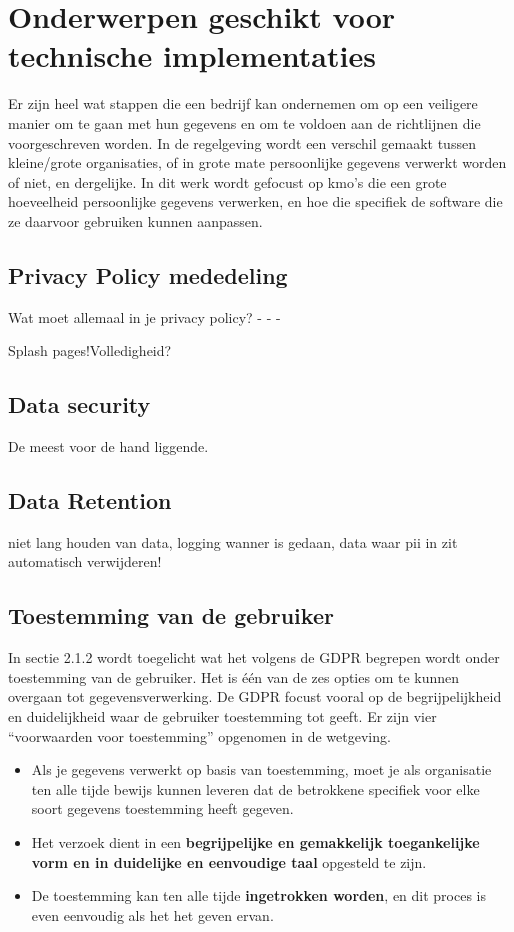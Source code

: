 \section{{Onderwerpen geschikt voor technische implementaties}}

Er zijn heel wat stappen die een bedrijf kan ondernemen om op een veiligere manier om te gaan met hun gegevens en om te voldoen aan de richtlijnen die voorgeschreven worden. 
In de regelgeving wordt een verschil gemaakt tussen kleine/grote organisaties, of in grote mate persoonlijke gegevens verwerkt worden of niet, en dergelijke. In dit werk wordt gefocust op kmo's die een grote hoeveelheid persoonlijke gegevens verwerken, en hoe die specifiek de software die ze daarvoor gebruiken kunnen aanpassen. 

\subsection{Privacy Policy mededeling}
Wat moet allemaal in je privacy policy? 
-
-
-


Splash pages!Volledigheid? 

\subsection{Data security}
De meest voor de hand liggende. 

\subsection{Data Retention}
niet lang houden van data, logging wanner is gedaan, data waar pii in zit automatisch verwijderen! 

\subsection{Toestemming van de gebruiker}
In sectie 2.1.2 wordt toegelicht wat het volgens de GDPR begrepen wordt onder toestemming van de gebruiker. Het is één van de zes opties om te kunnen overgaan tot gegevensverwerking. De GDPR focust vooral op de begrijpelijkheid en duidelijkheid waar de gebruiker toestemming tot geeft. Er zijn vier “voorwaarden voor toestemming” opgenomen in de wetgeving. 
\begin{itemize}
    \item  Als je gegevens verwerkt op basis van toestemming, moet je als organisatie ten alle tijde bewijs kunnen leveren dat de betrokkene specifiek voor elke soort gegevens toestemming heeft gegeven. 
    \item  Het verzoek dient in een \textbf{begrijpelijke en gemakkelijk toegankelijke vorm en in duidelijke en eenvoudige taal} opgesteld te zijn. 
    \item  
    De toestemming kan ten alle tijde \textbf{ingetrokken worden}, en dit proces is even eenvoudig als het het geven ervan. 
\end{itemize}


